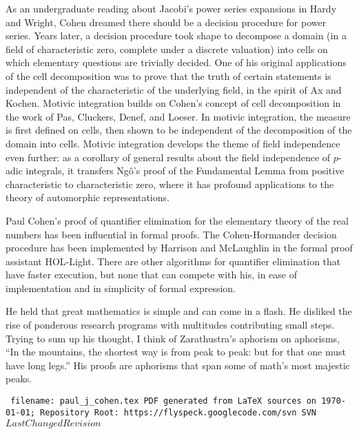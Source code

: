 \documentclass{llncs}
\def\svninfo{{\tt
  filename: paul\_j\_cohen.tex\hfill\break
  PDF generated from LaTeX sources on \today; \hfill\break
  Repository Root: https://flyspeck.googlecode.com/svn \hfill\break
  SVN $LastChangedRevision$
  }
  }
\begin{document}
\smallskip



As an undergraduate reading about Jacobi's power series expansions in Hardy and Wright, Cohen dreamed there should be 
a decision procedure for power series.   Years later, a decision procedure took 
shape to decompose a domain (in a field of characteristic zero, complete under a discrete valuation) into 
cells on which elementary questions are trivially decided.
One of his original applications of the
cell decomposition was to prove that the truth of certain statements is independent of the characteristic of the underlying field, in the spirit of Ax and Kochen.
Motivic integration builds on Cohen's concept of cell decomposition in the work of Pas, Cluckers, Denef, and Loeser.  In motivic integration, the measure is first defined on cells, then shown to be independent of the decomposition of the domain into cells.  
Motivic integration develops the theme of field independence even further: as a corollary of general results about the field independence of $p$-adic integrals, it transfers Ng\^o's proof of the Fundamental Lemma  from positive characteristic to characteristic zero, where it has profound applications to the theory of automorphic representations.

Paul Cohen's proof of quantifier elimination for the elementary theory of the real numbers has been influential
in formal proofs.  The
Cohen-Hormander decision procedure has been implemented by
Harrison and McLaughlin
in the formal proof assistant HOL-Light.  There are other algorithms for
quantifier elimination that have faster execution, but none that can compete with his, in ease of implementation and in simplicity of formal expression. 


He held that great
mathematics is simple and can come in a flash.
He disliked the rise of ponderous research programs with multitudes contributing
small steps.
Trying to sum up his thought, I think of Zarathustra's aphorism on aphorisms, ``In the mountains, the shortest way is from peak to peak: but for that one must have long legs.''  His proofs are aphorisms that span some of math's most
majestic peaks.  

\bigskip
\noindent
\svninfo
\end{document}
